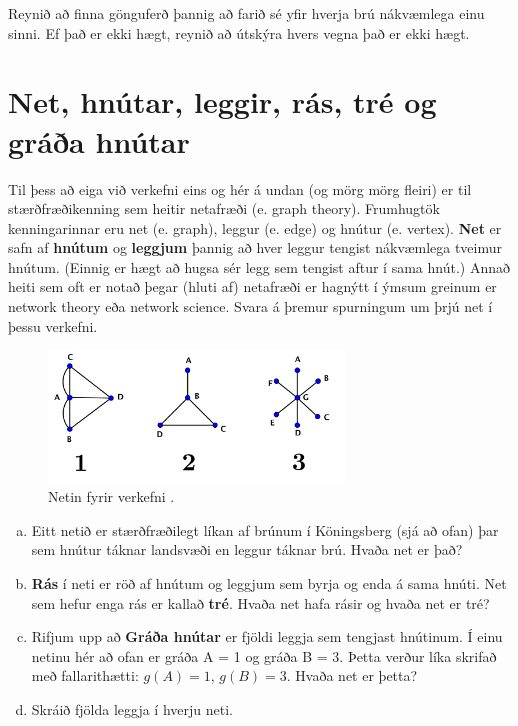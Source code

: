 \documentclass[b5paper,12pt]{book}
\renewcommand*\thesection{\arabic{section}}
\begin{document}
\noindent 
Reynið að finna gönguferð þannig að farið sé yfir hverja brú nákvæmlega einu sinni. Ef það er ekki hægt, reynið að útskýra hvers vegna það er ekki hægt.

\section{Net, hnútar, leggir, rás, tré og gráða hnútar}
Til þess að eiga við verkefni eins og hér á undan (og mörg mörg fleiri) er til stærðfræðikenning sem heitir netafræði (e. graph theory). Frumhugtök kenningarinnar eru net (e. graph), leggur (e. edge) og hnútur (e. vertex). \textbf{Net} er safn af \textbf{hnútum} og \textbf{leggjum} þannig að hver leggur tengist nákvæmlega tveimur hnútum. (Einnig er hægt að hugsa sér legg sem tengist aftur í sama hnút.) Annað heiti sem oft er notað þegar (hluti af) netafræði er hagnýtt í ýmsum greinum er network theory eða network science. Svara á þremur spurningum um þrjú net í þessu verkefni.

\begin{figure}[h]
  \includegraphics[width=0.7\textwidth, center]{fyrstunet.png}
  \caption*{Netin fyrir verkefni \thesection{}.}
\end{figure}

\begin{enumerate}[(a)]
\item Eitt netið er stærðfræðilegt líkan af brúnum í Köningsberg (sjá að ofan) þar sem hnútur táknar landsvæði en leggur táknar brú. Hvaða net er það?
\item \textbf{Rás} í neti er röð af hnútum og leggjum sem byrja og enda á sama hnúti. Net sem hefur enga rás er kallað \textbf{tré}. Hvaða net hafa rásir og hvaða net er tré?
\item Rifjum upp að \textbf{Gráða hnútar} er fjöldi leggja sem tengjast hnútinum. Í einu netinu hér að ofan er gráða A = 1 og gráða B = 3. Þetta verður líka skrifað með fallarithætti: $g(A)=1$, $g(B)=3$. Hvaða net er þetta?
\item Skráið fjölda leggja í hverju neti. 
\end{enumerate}
 
\end{document}
